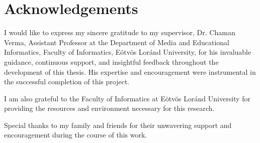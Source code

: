 \chapter*{Acknowledgements}

I would like to express my sincere gratitude to my supervisor, Dr. Chaman Verma, Assistant Professor at the Department of Media and Educational Informatics, Faculty of Informatics, Eötvös Loránd University, for his invaluable guidance, continuous support, and insightful feedback throughout the development of this thesis. His expertise and encouragement were instrumental in the successful completion of this project.

I am also grateful to the Faculty of Informatics at Eötvös Loránd University for providing the resources and environment necessary for this research.

Special thanks to my family and friends for their unwavering support and encouragement during the course of this work.
